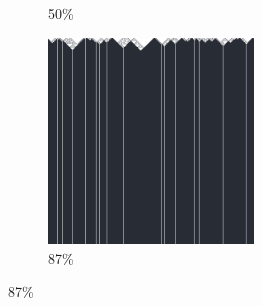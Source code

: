 \documentclass[12pt, fleqn]{report}                             %
\theoremstyle{break}                                            %
\begin{document}
\begin{figure}[ht!]
\begin{subfigure}[b]{0.4\linewidth}
          \caption{50\%}
        \end{subfigure}
        \begin{subfigure}[b]{0.4\linewidth}
          \includegraphics[width=0.6\textwidth]{Images/164/d.png}
          \caption{87\%}
        \end{subfigure}
      \end{figure}
\end{document}
